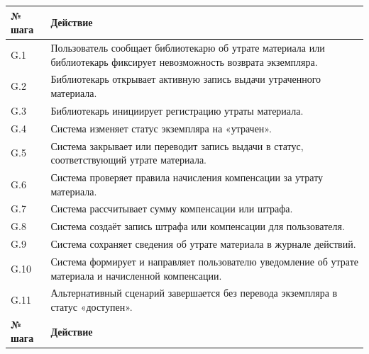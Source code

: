 \documentclass[12pt,a4paper]{article}
\begin{document}
\begin{xltabular}{\textwidth}{
				|>{\raggedright\arraybackslash}p{2.7cm}
				|>{\raggedright\arraybackslash}X|
			}
			
			\textbf{№ шага} & \textbf{Действие} \\
			\hline
			
			G.1 & Пользователь сообщает библиотекарю об утрате материала или
			библиотекарь фиксирует невозможность возврата экземпляра. \\
			\hline
			G.2 & Библиотекарь открывает активную запись выдачи утраченного
			материала. \\
			\hline
			G.3 & Библиотекарь инициирует регистрацию утраты материала. \\
			\hline
			G.4 & Система изменяет статус экземпляра на «утрачен». \\
			\hline
			G.5 & Система закрывает или переводит запись выдачи в статус,
			соответствующий утрате материала. \\
			\hline
			G.6 & Система проверяет правила начисления компенсации за утрату
			материала. \\
			\hline
			G.7 & Система рассчитывает сумму компенсации или штрафа. \\
			\hline
			G.8 & Система создаёт запись штрафа или компенсации для пользователя. \\
			\hline
			G.9 & Система сохраняет сведения об утрате материала в журнале действий. \\
			\hline
			G.10 & Система формирует и направляет пользователю уведомление об
			утрате материала и начисленной компенсации. \\
			\hline
			G.11 & Альтернативный сценарий завершается без перевода экземпляра в
			статус «доступен». \\
			\hline
			
			
			\textbf{№ шага} & \textbf{Действие} \\
			\hline
			

\end{xltabular}
\end{document}
